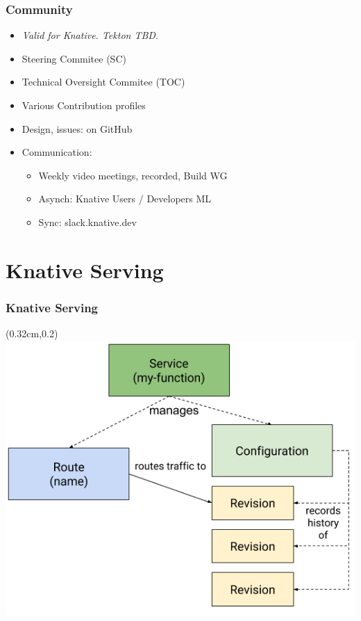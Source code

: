 \documentclass[aspectratio=169,11pt,hyperref={colorlinks=true}]{beamer}
\begin{document}
\begin{lblackrwhiteframe}
\begin{grayframe}
  \frametitle{Community}
  \begin{itemize}
    \item {\em Valid for Knative. Tekton TBD.}
    \item Steering Commitee (SC)
    \item Technical Oversight Commitee (TOC)
    \item Various Contribution profiles
    \item Design, issues: on GitHub
    \item Communication:
    \begin{itemize}
      \item Weekly video meetings, recorded, Build WG
      \item Asynch: Knative Users / Developers ML
      \item Sync: slack.knative.dev
    \end{itemize}
  \end{itemize}
\end{grayframe}

\section{Knative Serving}

\begin{tblackbgrayframe}
  \frametitle{Knative Serving}
  \begin{textblock*}{\paperwidth}(0.32cm,0.2\paperheight)
    \centering
    \includegraphics[width=0.5\paperwidth]{img/knative-serving.png}
  \end{textblock*}
\end{tblackbgrayframe}


\end{lblackrwhiteframe}
\end{document}
